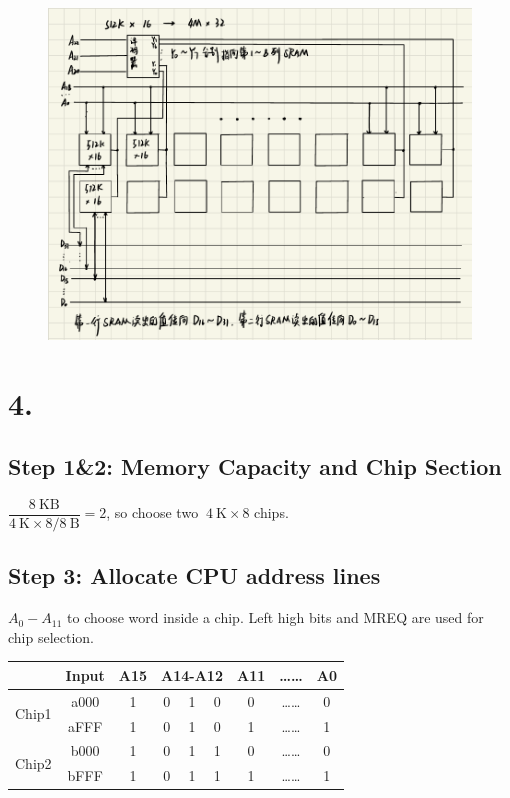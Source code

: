 \documentclass[11pt]{article}  %
\begin{document}
\begin{figure}[H]
    \centering
    \includegraphics[width = 1\textwidth]{pic/2.pdf}
\end{figure}

\section*{4. }

\subsection*{Step 1\&2: Memory Capacity and Chip Section}
$\dfrac{8~\text{KB}}{4~\text{K}\times 8 / 8~\text{B}} = 2$, so choose two $~4~\text{K}\times8$ chips.

\subsection*{Step 3: Allocate CPU address lines}
$A_0-A_{11}$ to choose word inside a chip. Left high bits and MREQ are used for chip selection.
\begin{table}[H]
    \centering
    \begin{tabular}{|l|c|c|ccc|c|c|c|}
    \hline
                           & Input & A15 & \multicolumn{3}{c|}{A14-A12}                        & A11 & …… & A0 \\ \hline
    \multirow{2}{*}{Chip1} & a000  & 1   & \multicolumn{1}{c|}{0} & \multicolumn{1}{c|}{1} & 0 & 0   & …… & 0  \\ \cline{2-9} 
                           & aFFF  & 1   & \multicolumn{1}{c|}{0} & \multicolumn{1}{c|}{1} & 0 & 1   & …… & 1  \\ \hline
    \multirow{2}{*}{Chip2} & b000  & 1   & \multicolumn{1}{c|}{0} & \multicolumn{1}{c|}{1} & 1 & 0   & …… & 0  \\ \cline{2-9} 
                           & bFFF  & 1   & \multicolumn{1}{c|}{0} & \multicolumn{1}{c|}{1} & 1 & 1   & …… & 1  \\ \hline
    \end{tabular}
\end{table}
\end{document}
